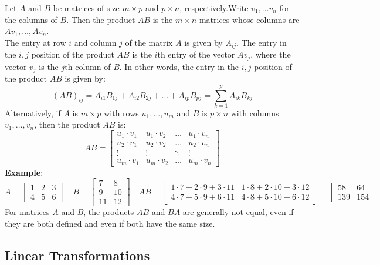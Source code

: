 \documentclass[a4paper, 9pt]{extarticle}
\begin{document}
Let $A$ and $B$ be matrices of size $m \times p$ and $p \times n$, respectively.Write $v_1, \ldots v_n$ for the columns of $B$. Then the product $AB$ is the $m \times n$ matrices whose columns are $Av_1 , \ldots, Av_n$. \\[2ex]
The entry at row $i$ and column $j$ of the matrix $A$ is given by $A_{ij}$. The entry in the $i,j$ position of the product $AB$ is the $i$th entry of the vector $Av_j$, where the vector $v_j$ is the $j$th column of $B$. In other words, the entry in the $i,j$ position of the product $AB$ is given by:
$$
  (AB)_{ij} = A_{i1}B_{1j} + A_{i2}B_{2j} + \ldots + A_{ip}B_{pj} = \sum_{k=1}^p A_{ik}B_{kj}
$$
Alternatively, if $A$ is $m \times p$ with rows $u_1, \ldots, u_m$ and $B$ is $p \times n$ with columns $v_1, \ldots, v_n$, then the product $AB$ is:
$$AB =
  \begin{bmatrix}
    u_1 \cdot v_1 & u_1 \cdot v_2 & \ldots & u_1 \cdot v_n \\
    u_2 \cdot v_1 & u_2 \cdot v_2 & \ldots & u_2 \cdot v_n \\
    \vdots        & \vdots        & \ddots & \vdots        \\
    u_m \cdot v_1 & u_m \cdot v_2 & \ldots & u_m \cdot v_n
  \end{bmatrix}
$$
\textbf{Example}:
$$
  A =
  \begin{bmatrix}
    1 & 2 & 3 \\
    4 & 5 & 6
  \end{bmatrix}
  \quad
  B =
  \begin{bmatrix}
    7  & 8  \\
    9  & 10 \\
    11 & 12
  \end{bmatrix}
  \quad
  AB =
  \begin{bmatrix}
    1 \cdot 7 + 2 \cdot 9 + 3 \cdot 11 & 1 \cdot 8 + 2 \cdot 10 + 3 \cdot 12 \\
    4 \cdot 7 + 5 \cdot 9 + 6 \cdot 11 & 4 \cdot 8 + 5 \cdot 10 + 6 \cdot 12
  \end{bmatrix}
  =
  \begin{bmatrix}
    58  & 64  \\
    139 & 154
  \end{bmatrix}
$$
For matrices $A$ and $B$, the products $AB$ and $BA$ are generally not
equal, even if they are both defined and even if both have the same
size.
\subsection*{Linear Transformations}
\end{document}
